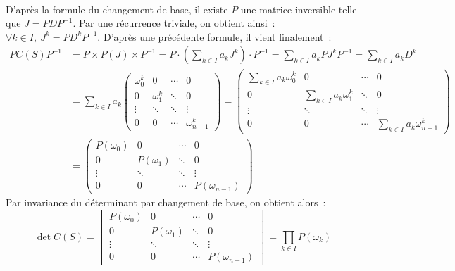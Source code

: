 \documentclass{article}
\begin{document}
  \paragraph{} D'après la formule du changement de base, il existe $P$ une matrice inversible telle que $J = PDP^{-1}$. Par une récurrence triviale, on obtient ainsi~: $\forall k\in I,\: J^k = PD^kP^{-1}$. D'après une précédente formule, il vient finalement~:
  \begin{align*}
    PC(S)P^{-1} &= P \times P(J) \times P^{-1} = P \cdot\left(\sum_{k\in I} a_k J^k\right) \cdot P^{-1} = \sum_{k\in I} a_k PJ^kP^{-1} = \sum_{k\in I} a_k D^k \\
    &= \sum_{k\in I} a_k \begin{pmatrix}
      \omega_0^k & 0 & \cdots & 0 \\
      0 & \omega_1^k & \ddots & 0 \\
      \vdots & \ddots & \ddots & \vdots \\
      0 & 0 & \cdots & \omega_{n-1}^k
    \end{pmatrix} =
    \begin{pmatrix}
      \sum_{k\in I} a_k\omega_0^k & 0 & \cdots & 0 \\
      0 & \sum_{k\in I} a_k\omega_1^k & \ddots & 0 \\
      \vdots & \ddots & \ddots & \vdots \\
      0 & 0 & \cdots & \sum_{k\in I} a_k\omega_{n-1}^k
    \end{pmatrix} \\
    &= \begin{pmatrix}
      P(\omega_0) & 0 & \cdots & 0 \\
      0 & P(\omega_1) & \ddots & 0 \\
      \vdots & \ddots & \ddots & \vdots \\
      0 & 0 & \cdots & P(\omega_{n-1})
    \end{pmatrix}
  \end{align*}
  Par invariance du déterminant par changement de base, on obtient alors~:
  \[
    \det C(S) = \begin{vmatrix}
      P(\omega_0) & 0 & \cdots & 0 \\
      0 & P(\omega_1) & \ddots & 0 \\
      \vdots & \ddots & \ddots & \vdots \\
      0 & 0 & \cdots & P(\omega_{n-1})
    \end{vmatrix} = \prod_{k\in I} P(\omega_k)
  \]
\end{document}
